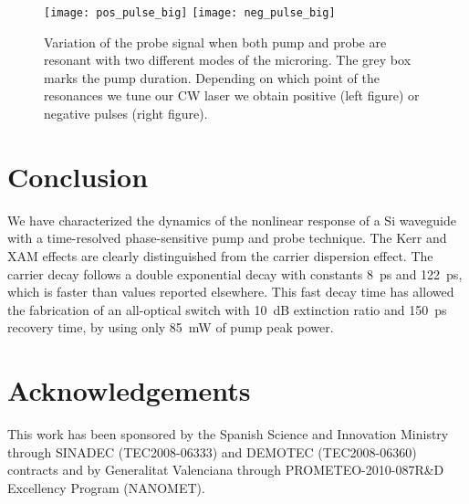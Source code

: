 \begin{figure}[htb]
    \centering
    \texttt{[image: pos\_pulse\_big]}
    \texttt{[image: neg\_pulse\_big]}
    \caption{Variation of the probe signal when both pump and probe are resonant with two different modes of the microring. The grey box marks the pump duration. Depending on which point of the resonances we tune our CW laser we obtain positive (left figure) or negative pulses (right figure).}
    \label{fig:ntc02switching}
\end{figure}

\section{Conclusion}
We have characterized the dynamics of the nonlinear response of a Si waveguide with a time-resolved phase-sensitive pump and probe technique. The Kerr and XAM effects are clearly distinguished from the carrier dispersion effect. The carrier decay follows a double exponential decay with constants 8~ps and 122~ps, which is faster than values reported elsewhere. This fast decay time has allowed the fabrication of an all-optical switch with 10~dB extinction ratio and 150~ps recovery time, by using only 85~mW of pump peak power.

\section*{Acknowledgements}
This work has been sponsored by the Spanish Science and Innovation Ministry through SINADEC (TEC2008-06333) and DEMOTEC (TEC2008-06360) contracts and by Generalitat Valenciana through PROMETEO-2010-087R\&D Excellency Program (NANOMET).



